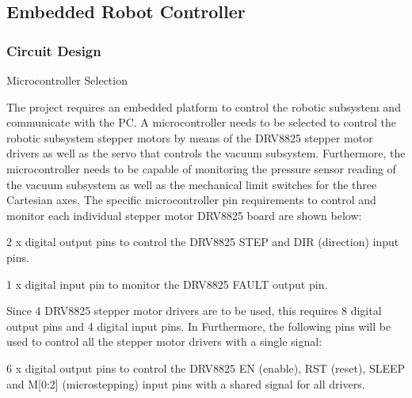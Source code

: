 \subsection{Embedded Robot Controller}

\subsubsection{Circuit Design}

Microcontroller Selection

The project requires an embedded platform to control the robotic subsystem and communicate with the PC. A microcontroller needs to be selected to control the robotic subsystem stepper motors by means of the DRV8825 stepper motor drivers as well as the servo that controls the vacuum subsystem. Furthermore, the microcontroller needs to be capable of monitoring the pressure sensor reading of the vacuum subsystem as well as the mechanical limit switches for the three Cartesian axes. The specific microcontroller pin requirements to control and monitor each individual stepper motor DRV8825 board are shown below:

\begin{compactitem}
	\item 2 x digital output pins to control the DRV8825 STEP and DIR (direction)  input pins.
	\item 1 x digital input pin to monitor the DRV8825 FAULT output pin.
\end{compactitem}

Since 4 DRV8825 stepper motor drivers are to be used, this requires 8 digital output pins and 4 digital input pins. In Furthermore, the following pins will be used to control all the stepper motor drivers with a single signal:

\begin{compactitem}
	\item 6 x digital output pins to control the DRV8825 EN (enable), RST (reset), SLEEP and M[0:2] (microstepping) input pins with a shared signal for all drivers.
\end{compactitem}

